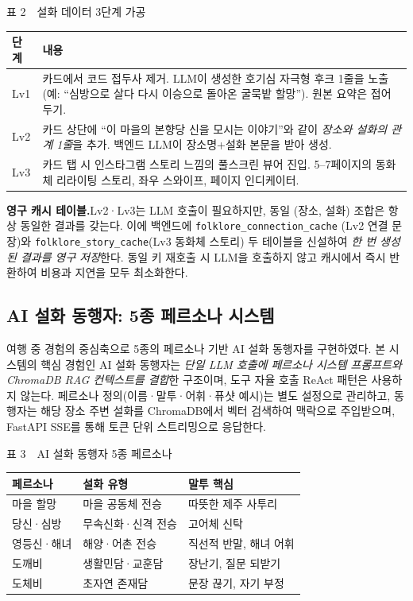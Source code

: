 \documentclass[10pt,twocolumn,a4paper]{article}
\begin{document}
\begin{table}[H]
\centering
{\small 표 2~~설화 데이터 3단계 가공}
\label{tab:lv}
\vspace{2pt}

\footnotesize
\begin{tabularx}{\columnwidth}{lX}
\toprule
단계 & 내용 \\
\midrule
Lv1 & 카드에서 코드 접두사 제거. LLM이 생성한 호기심 자극형 후크 1줄을
노출(예: ``심방으로 살다 다시 이승으로 돌아온 굴묵밭 할망''). 원본 요약은
접어두기. \\
Lv2 & 카드 상단에 ``이 마을의 본향당 신을 모시는 이야기''와 같이 \emph{장소와
설화의 관계 1줄}을 추가. 백엔드 LLM이 장소명+설화 본문을 받아 생성. \\
Lv3 & 카드 탭 시 인스타그램 스토리 느낌의 풀스크린 뷰어 진입. 5--7페이지의
동화체 리라이팅 스토리, 좌우 스와이프, 페이지 인디케이터. \\
\bottomrule
\end{tabularx}
\end{table}

\textbf{영구 캐시 테이블.}\quad Lv2·Lv3는 LLM 호출이 필요하지만, 동일 (장소,
설화) 조합은 항상 동일한 결과를 갖는다. 이에 백엔드에 \texttt{folklore\_connection\_cache}
(Lv2 연결 문장)와 \texttt{folklore\_story\_cache}(Lv3 동화체 스토리) 두 테이블을
신설하여 \emph{한 번 생성된 결과를 영구 저장}한다. 동일 키 재호출 시 LLM을
호출하지 않고 캐시에서 즉시 반환하여 비용과 지연을 모두 최소화한다.

\subsection{AI 설화 동행자: 5종 페르소나 시스템}

여행 중 경험의 중심축으로 5종의 페르소나 기반 AI 설화 동행자를 구현하였다.
본 시스템의 핵심 경험인 AI 설화 동행자는 \emph{단일 LLM 호출에 페르소나
시스템 프롬프트와 ChromaDB RAG 컨텍스트를 결합}한 구조이며, 도구 자율 호출
ReAct 패턴은 사용하지 않는다. 페르소나 정의(이름·말투·어휘·퓨샷 예시)는
별도 설정으로 관리하고, 동행자는 해당 장소 주변 설화를 ChromaDB에서 벡터
검색하여 맥락으로 주입받으며, FastAPI SSE를 통해 토큰 단위 스트리밍으로
응답한다.

\begin{table}[H]
\centering
{\small 표 3~~AI 설화 동행자 5종 페르소나}
\label{tab:persona}
\vspace{2pt}

\footnotesize
\begin{tabularx}{\columnwidth}{lXl}
\toprule
페르소나 & 설화 유형 & 말투 핵심 \\
\midrule
마을 할망       & 마을 공동체 전승       & 따뜻한 제주 사투리 \\
당신·심방       & 무속신화·신격 전승     & 고어체 신탁 \\
영등신·해녀     & 해양·어촌 전승         & 직선적 반말, 해녀 어휘 \\
도깨비         & 생활민담·교훈담         & 장난기, 질문 되받기 \\
도체비         & 초자연 존재담           & 문장 끊기, 자기 부정 \\
\bottomrule
\end{tabularx}
\end{table}
\end{document}

